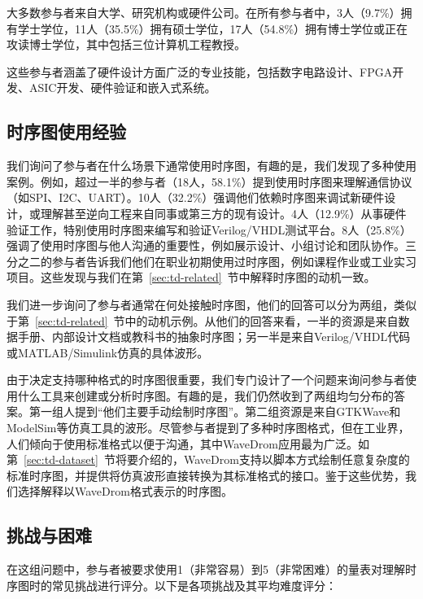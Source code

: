 大多数参与者来自大学、研究机构或硬件公司。在所有参与者中，3人（9.7\%）拥有学士学位，11人（35.5\%）拥有硕士学位，17人（54.8\%）拥有博士学位或正在攻读博士学位，其中包括三位计算机工程教授。

这些参与者涵盖了硬件设计方面广泛的专业技能，包括数字电路设计、FPGA开发、ASIC开发、硬件验证和嵌入式系统。

\subsection{时序图使用经验}

我们询问了参与者在什么场景下通常使用时序图，有趣的是，我们发现了多种使用案例。例如，超过一半的参与者（18人，58.1\%）提到使用时序图来理解通信协议（如SPI、I2C、UART）。10人（32.2\%）强调他们依赖时序图来调试新硬件设计，或理解甚至逆向工程来自同事或第三方的现有设计。4人（12.9\%）从事硬件验证工作，特别使用时序图来编写和验证Verilog/VHDL测试平台。8人（25.8\%）强调了使用时序图与他人沟通的重要性，例如展示设计、小组讨论和团队协作。三分之二的参与者告诉我们他们在职业初期使用过时序图，例如课程作业或工业实习项目。这些发现与我们在第~\ref{sec:td-related}~节中解释时序图的动机一致。

我们进一步询问了参与者通常在何处接触时序图，他们的回答可以分为两组，类似于第~\ref{sec:td-related}~节中的动机示例。从他们的回答来看，一半的资源是来自数据手册、内部设计文档或教科书的抽象时序图；另一半是来自Verilog/VHDL代码或MATLAB/Simulink仿真的具体波形。

由于决定支持哪种格式的时序图很重要，我们专门设计了一个问题来询问参与者使用什么工具来创建或分析时序图。有趣的是，我们仍然收到了两组均匀分布的答案。第一组人提到“他们主要手动绘制时序图”。第二组资源是来自GTKWave和ModelSim等仿真工具的波形。尽管参与者提到了多种时序图格式，但在工业界，人们倾向于使用标准格式以便于沟通，其中WaveDrom应用最为广泛。如第~\ref{sec:td-dataset}~节将要介绍的，WaveDrom支持以脚本方式绘制任意复杂度的标准时序图，并提供将仿真波形直接转换为其标准格式的接口。鉴于这些优势，我们选择解释以WaveDrom格式表示的时序图。

\subsection{挑战与困难}

在这组问题中，参与者被要求使用1（非常容易）到5（非常困难）的量表对理解时序图时的常见挑战进行评分。以下是各项挑战及其平均难度评分：

